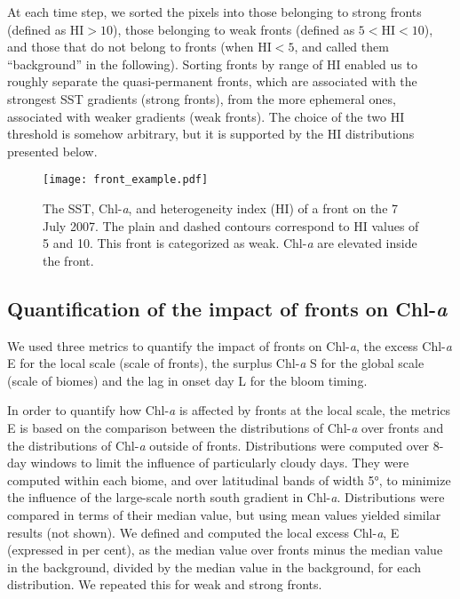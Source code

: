 At each time step, we sorted the pixels into those belonging to strong fronts (defined as \(\mathrm{HI} > 10\)), those belonging to weak fronts (defined as \(5 < \mathrm{HI} < 10\)), and those that do not belong to fronts (when \(\mathrm{HI} < 5\), and called them ``background'' in the following).
Sorting fronts by range of HI enabled us to roughly separate the quasi-permanent fronts, which are associated with the strongest SST gradients (strong fronts), from the more ephemeral ones, associated with weaker gradients (weak fronts).
The choice of the two HI threshold is somehow arbitrary, but it is supported by the HI distributions presented below.


\begin{figure*}
  \texttt{[image: front\_example.pdf]}
  \caption{
    The SST, Chl\nobreakdash-\emph{a}, and heterogeneity index (HI) of a front on the 7 July 2007.
    The plain and dashed contours correspond to HI values of 5 and 10.
    This front is categorized as weak.
    Chl\nobreakdash-\emph{a} are elevated inside the front.
  }%
  \label{fig:zoom}
\end{figure*}

\subsection{Quantification of the impact of fronts on Chl\nobreakdash-\emph{a}}

We used three metrics to quantify the impact of fronts on Chl\nobreakdash-\emph{a}, the excess Chl\nobreakdash-\emph{a}  E for the local scale (scale of fronts), the surplus Chl\nobreakdash-\emph{a}  S for the global scale (scale of biomes) and the lag in onset day L for the bloom timing.

In order to quantify how Chl\nobreakdash-\emph{a} is affected by fronts at the local scale, the metrics E is based on the comparison between the distributions of Chl\nobreakdash-\emph{a} over fronts and the distributions of Chl\nobreakdash-\emph{a} outside of fronts.
Distributions were computed over 8-day windows to limit the influence of particularly cloudy days.
They were computed within each biome, and over latitudinal bands of width 5°, to minimize the influence of the large-scale north south gradient in Chl\nobreakdash-\emph{a}.
Distributions were compared in terms of their median value, but using mean values yielded similar results (not shown).
We defined and computed the local excess Chl\nobreakdash-\emph{a}, E (expressed in per cent), as the median value over fronts minus the median value in the background, divided by the median value in the background, for each distribution.
We repeated this for weak and strong fronts.

